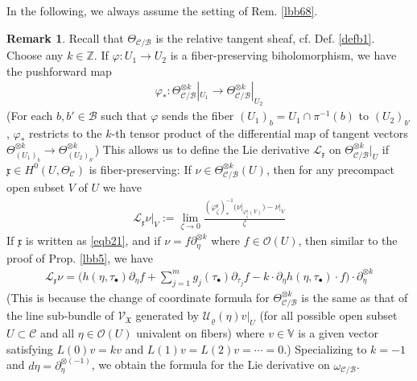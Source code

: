 \documentclass[11pt,b5paper,notitlepage]{article}
\theoremstyle{definition}
\newtheorem{rem}[df]{Remark}
\theoremstyle{plain}
\newcommand{\fk}{\mathfrak}
\newcommand{\mc}{\mathcal}
\newcommand{\scr}{\mathscr}
\newcommand{\xk}{\mathfrak x}
\newcommand{\blt}{\bullet}
\newcommand{\Vbb}{\mathbb V}
\newcommand{\Cbb}{\mathbb C}
\newcommand{\Zbb}{\mathbb Z}
\newcommand{\<}{\left\langle}
\renewcommand{\>}{\right\rangle}
\newcommand{\MC}{\mathcal{C}}
\newcommand{\MB}{\mathcal{B}}
\newcommand{\fx}{\mathfrak{X}}
\numberwithin{equation}{section}
\begin{document}
In the following, we always assume the setting of Rem. \ref{lbb68}.

\begin{rem}\label{lbb6}
Recall that $\Theta_{\MC/\MB}$ is the relative tangent sheaf, cf. Def. \ref{defb1}. Choose any $k\in\Zbb$. If $\varphi:U_1\rightarrow U_2$ is a fiber-preserving biholomorphism, we have the pushforward map
\begin{align*}
\varphi_*:\Theta_{\mc C/\mc B}^{\otimes k}|_{U_1}\rightarrow\Theta_{\mc C/\mc B}^{\otimes k}|_{U_2}
\end{align*}
(For each $b,b'\in\mc B$ such that $\varphi$ sends the fiber $(U_1)_b=U_1\cap \pi^{-1}(b)$ to $(U_2)_{b'}$, $\varphi_*$ restricts to the $k$-th tensor product of the differential map of tangent vectors  $\Theta_{(U_1)_b}^{\otimes k}\rightarrow\Theta^{\otimes k}_{(U_2)_{b'}}$) This allows us to define the Lie derivative $\mc L_\xk$ on $\Theta^{\otimes k}_{\mc C/\mc B}|_U$ if $\xk\in H^0(U,\Theta_\MC)$ is fiber-preserving: If $\nu\in \Theta^{\otimes k}_{\mc C/\mc B}(U)$, then for any precompact open subset $V$ of $U$ we have
\begin{align*}
\mc L_\xk\nu|_V:=\lim_{\zeta\rightarrow 0} \frac{(\varphi^\xk_\zeta)_*^{-1}\big(\nu\vert_{\varphi_\zeta^\xk(V)}\big)-\nu\vert_V}{\zeta}
\end{align*}
If $\xk$ is written as \eqref{eqb21}, and if $\nu=f \partial_\eta^{\otimes k}$ where $f\in\mc O(U)$, then similar to the proof of Prop. \ref{lbb5}, we have
\begin{align}\label{eqb42}
\mc L_\xk\nu=\Big(h(\eta,\tau_\blt)\partial_\eta f+\sum_{j=1}^m g_j(\tau_\blt)\partial_{\tau_j}f-k\cdot \partial_\eta h(\eta,\tau_\blt)\cdot f\Big)\cdot \partial_\eta^{\otimes k}
\end{align}
(This is because the change of coordinate formula for $\Theta_{\mc C/\mc B}^{\otimes k}$ is the same as that of the line sub-bundle of $\scr V_\fx$ generated by $\mc U_\varrho(\eta)v\big|_U$ (for all possible open subset $U\subset\mc C$ and all $\eta\in\mc O(U)$ univalent on fibers) where $v\in\Vbb$ is a given vector satisfying $L(0)v=kv$ and $L(1)v=L(2)v=\cdots=0$.)
Specializing to $k=-1$ and $d\eta=\partial_\eta^{\otimes(-1)}$, we obtain the formula for the Lie derivative on $\omega_{\mc C/\mc B}$.
\end{rem}
\end{document}
